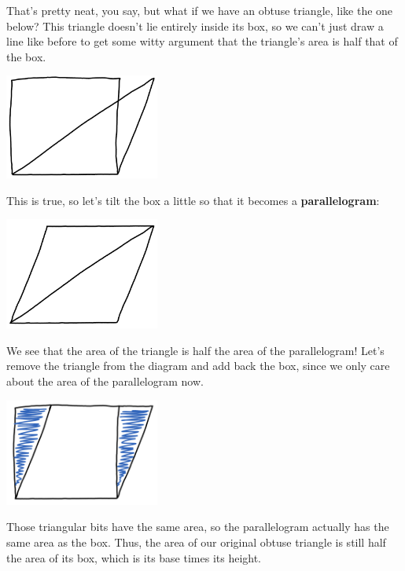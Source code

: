 \documentclass{article}
\begin{document}
That's pretty neat, you say, but what if we have an obtuse triangle, like the one below? This triangle doesn't lie entirely inside its box, so we can't just draw a line like before to get some witty argument that the triangle's area is half that of the box.
\begin{center}
    \centering
    \includegraphics[width=2in]{images/triangle_areas/part_1/obtuse_triangle_in_box.png}
\end{center}
This is true, so let's tilt the box a little so that it becomes a \textbf{parallelogram}:
\begin{center}
    \centering
    \includegraphics[width=2in]{images/triangle_areas/part_1/obtuse_triangle_in_parallelogram.png}
\end{center}
We see that the area of the triangle is half the area of the parallelogram! Let's remove the triangle from the diagram and add back the box, since we only care about the area of the parallelogram now.
\begin{center}
    \centering
    \includegraphics[width=2in]{images/triangle_areas/part_1/parallelogram_box.png}
\end{center}
Those triangular bits have the same area, so the parallelogram actually has the same area as the box. Thus, the area of our original obtuse triangle is still half the area of its box, which is its base times its height.
\end{document}
